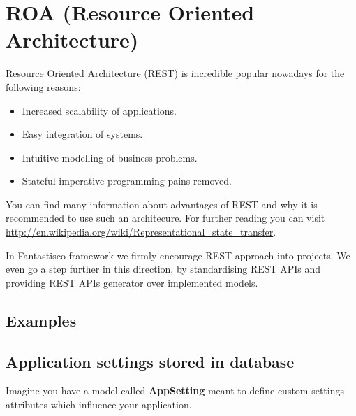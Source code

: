 \documentclass[letterpaper,10pt,english]{sphinxmanual}
\begin{document}
\section{ROA (Resource Oriented Architecture)}
\label{features/roa:roa-resource-oriented-architecture}\label{features/roa::doc}
Resource Oriented Architecture (REST) is incredible popular nowadays for the following reasons:
\begin{itemize}
\item {} 
Increased scalability of applications.

\item {} 
Easy integration of systems.

\item {} 
Intuitive modelling of business problems.

\item {} 
Stateful imperative programming pains removed.

\end{itemize}

You can find many information about advantages of REST and why it is recommended to use such an architecure. For further reading
you can visit \href{http://en.wikipedia.org/wiki/Representational\_state\_transfer}{http://en.wikipedia.org/wiki/Representational\_state\_transfer}.

In Fantastisco framework we firmly encourage REST approach into projects. We even go a step further in this direction, by
standardising REST APIs and providing REST APIs generator over implemented models.


\subsection{Examples}
\label{features/roa:examples}

\subsection{Application settings stored in database}
\label{features/roa:application-settings-stored-in-database}
Imagine you have a model called \textbf{AppSetting} meant to define custom settings attributes which influence your application.
\end{document}
